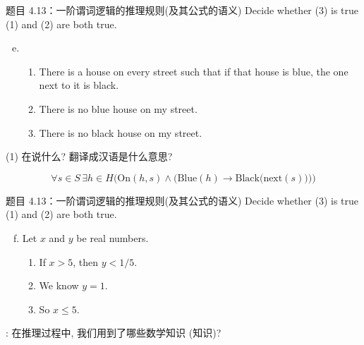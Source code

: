 \begin{frame}{}
  \begin{exampleblock}{题目 4.13：一阶谓词逻辑的推理规则(及其公式的语义)}
    Decide whether (3) is true  (1) and (2) are both true.

    \begin{enumerate}[(a)]
      \setcounter{enumi}{4}
      \item 
	\begin{enumerate}[(1)]
	  \item There is a house on every street such that if that house is blue,
	    the one next to it is black.
	  \item There is no blue house on my street.
	  \item There is no black house on my street.
	\end{enumerate}
    \end{enumerate}
  \end{exampleblock}

  \vspace{0.30cm}
  \centerline{(1) 在说什么? 翻译成汉语是什么意思?}

  \pause

  \pause
  \[
    \forall s\in S\, \exists h \in H 
    \Big(\text{On}(h,s) \land \big(\text{Blue}(h) \to \text{Black}\big(\text{next}(s)\big) \big)\Big)
  \]
\end{frame}

\begin{frame}{}
  \begin{exampleblock}{题目 4.13：一阶谓词逻辑的推理规则(及其公式的语义)}
    Decide whether (3) is true  (1) and (2) are both true.

    \begin{enumerate}[(a)]
      \setcounter{enumi}{5}
      \item Let $x$ and $y$ be real numbers.
	\begin{enumerate}[(1)]
	  \item If $x > 5$, then $y < 1/5$.
	  \item We know $y = 1$.
	  \item So $x \le 5$.
	\end{enumerate}
    \end{enumerate}
  \end{exampleblock}

  \pause
  \vspace{0.80cm}
  \centerline{: 在推理过程中, 我们用到了哪些数学知识 (知识)?}
\end{frame}


